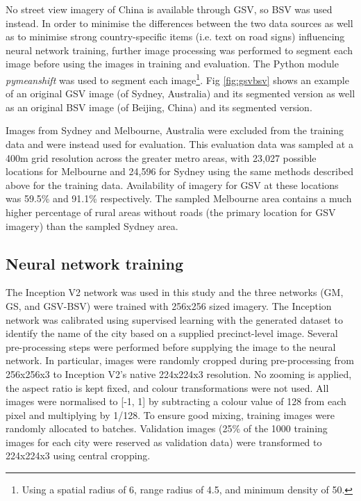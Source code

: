 \documentclass[10pt,letterpaper,hidelinks]{article}
\begin{document}
No street view imagery of China is available through GSV, so BSV was used instead.  In order to minimise the differences between the two data sources as well as to minimise strong country-specific items (i.e. text on road signs) influencing neural network training, further image processing was performed to segment each image before using the images in training and evaluation. The Python module \textit{pymeanshift} \cite{Pymeanshift2017} was used to segment each image\footnote{Using a spatial radius of 6, range radius of 4.5, and minimum density of 50.}. Fig \ref{fig:gsvbsv} shows an example of an original GSV image (of Sydney, Australia) and its segmented version as well as an original BSV image (of Beijing, China) and its segmented version.


Images from Sydney and Melbourne, Australia were excluded from the training data and were instead used for evaluation. This evaluation data was sampled at a 400m grid resolution across the greater metro areas, with 23,027 possible locations for Melbourne and 24,596 for Sydney using the same methods described above for the training data. Availability of imagery for GSV at these locations was 59.5\% and 91.1\% respectively. The sampled Melbourne area contains a much higher percentage of rural areas without roads (the primary location for GSV imagery) than the sampled Sydney area.


\subsection*{Neural network training}\label{sec:methods4}    

The Inception V2 network was used in this study and the three networks (GM, GS, and GSV-BSV) were trained with 256x256 sized imagery. The Inception network was calibrated using supervised learning with the generated dataset to identify the name of the city based on a supplied precinct-level image. Several pre-processing steps were performed before supplying the image to the neural network. In particular, images were randomly cropped during pre-processing from 256x256x3 to Inception V2's native 224x224x3 resolution. No zooming is applied, the aspect ratio is kept fixed, and colour transformations were not used. All images were normalised to [-1, 1] by subtracting a colour value of 128 from each pixel and multiplying by 1/128. To ensure good mixing, training images were randomly allocated to batches. Validation images (25\% of the 1000 training images for each city were reserved as validation data) were transformed to 224x224x3 using central cropping.
\end{document}
